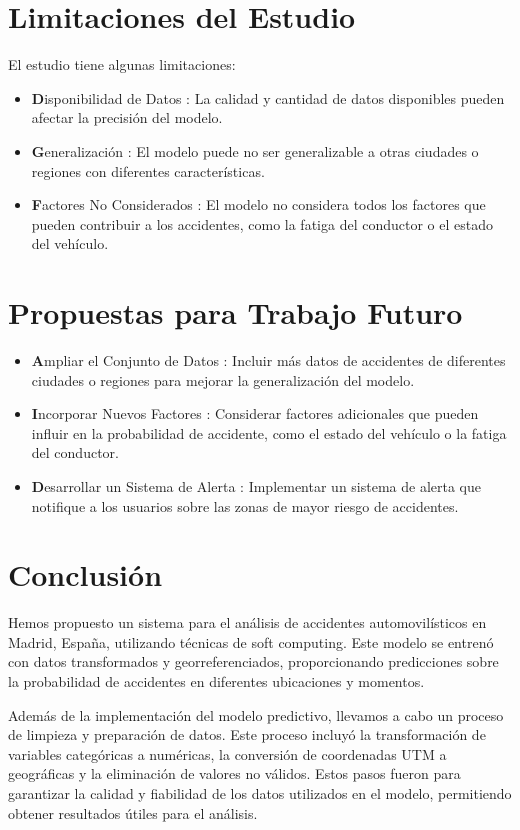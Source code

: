 \section{Limitaciones del Estudio}
El estudio tiene algunas limitaciones:
\begin{itemize}
\item \textbf Disponibilidad de Datos : La calidad y cantidad de datos disponibles pueden afectar la precisión del modelo.
\item \textbf Generalización : El modelo puede no ser generalizable a otras ciudades o regiones con diferentes características.
\item \textbf Factores No Considerados : El modelo no considera todos los factores que pueden contribuir a los accidentes, como la fatiga del conductor o el estado del vehículo.
\end{itemize}


\section{Propuestas para Trabajo Futuro}
\begin{itemize}
\item \textbf	Ampliar el Conjunto de Datos : Incluir más datos de accidentes de diferentes ciudades o regiones para mejorar la generalización del modelo.
\item \textbf	Incorporar Nuevos Factores : Considerar factores adicionales que pueden influir en la probabilidad de accidente, como el estado del vehículo o la fatiga del conductor.
\item \textbf	Desarrollar un Sistema de Alerta : Implementar un sistema de alerta que notifique a los usuarios sobre las zonas de mayor riesgo de accidentes.
\end{itemize}

\section{Conclusión}
Hemos propuesto un sistema para el análisis de accidentes automovilísticos en Madrid, España, utilizando técnicas de soft computing. Este modelo se entrenó con datos transformados y georreferenciados, proporcionando predicciones sobre la probabilidad de accidentes en diferentes ubicaciones y momentos.

Además de la implementación del modelo predictivo, llevamos a cabo un proceso de limpieza y preparación de datos. Este proceso incluyó la transformación de variables categóricas a numéricas, la conversión de coordenadas UTM a geográficas y la eliminación de valores no válidos. Estos pasos fueron para garantizar la calidad y fiabilidad de los datos utilizados en el modelo, permitiendo obtener resultados útiles para el análisis.

